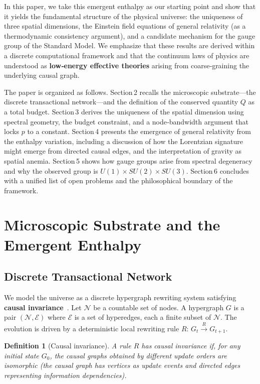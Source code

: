 \documentclass{article}
\newtheorem{definition}[theorem]{Definition}
\begin{document}
In this paper, we take this emergent enthalpy as our starting point and show that it yields the fundamental structure of the physical universe: the uniqueness of three spatial dimensions, the Einstein field equations of general relativity (as a thermodynamic consistency argument), and a candidate mechanism for the gauge group of the Standard Model. We emphasize that these results are derived within a discrete computational framework and that the continuum laws of physics are understood as \textbf{low‑energy effective theories} arising from coarse‑graining the underlying causal graph.

The paper is organized as follows. Section 2 recalls the microscopic substrate—the discrete transactional network—and the definition of the conserved quantity $Q$ as a total budget. Section 3 derives the uniqueness of the spatial dimension using spectral geometry, the budget constraint, and a node‑bandwidth argument that locks $p$ to a constant. Section 4 presents the emergence of general relativity from the enthalpy variation, including a discussion of how the Lorentzian signature might emerge from directed causal edges, and the interpretation of gravity as spatial anemia. Section 5 shows how gauge groups arise from spectral degeneracy and why the observed group is $U(1) \times SU(2) \times SU(3)$. Section 6 concludes with a unified list of open problems and the philosophical boundary of the framework.

\section{Microscopic Substrate and the Emergent Enthalpy}
\subsection{Discrete Transactional Network}
We model the universe as a discrete hypergraph rewriting system satisfying \textbf{causal invariance}~\cite{wolfram}. Let $\mathcal{N}$ be a countable set of nodes. A hypergraph $G$ is a pair $(\mathcal{N}, \mathcal{E})$ where $\mathcal{E}$ is a set of hyperedges, each a finite subset of $\mathcal{N}$. The evolution is driven by a deterministic local rewriting rule $R$: $G_t \xrightarrow{R} G_{t+1}$.

\begin{definition}[Causal invariance]
A rule $R$ has causal invariance if, for any initial state $G_0$, the causal graphs obtained by different update orders are isomorphic (the causal graph has vertices as update events and directed edges representing information dependencies).
\end{definition}
\end{document}
